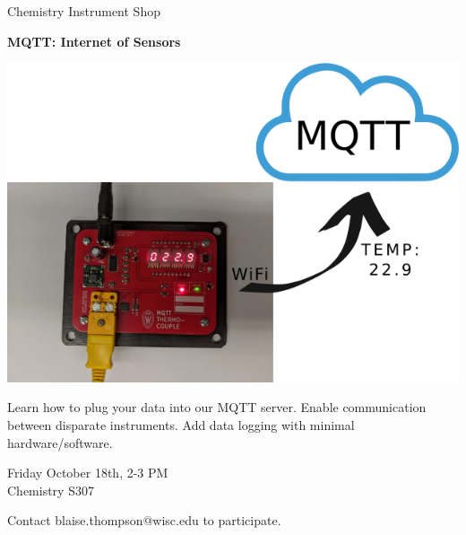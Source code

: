 \documentclass{article}
\begin{document}
\center

\Huge

Chemistry Instrument Shop

\textbf{
MQTT: Internet of Sensors
}

\includegraphics[width=\linewidth]{coverart.png}

{
\huge
Learn how to plug your data into our MQTT server.
Enable communication between disparate instruments.
Add data logging with minimal hardware/software.
}

\vfill

{
\huge
Friday October 18th, 2-3 PM \\
Chemistry S307
}

\vfill

{
\huge
Contact blaise.thompson@wisc.edu to participate.
}
\end{document}
